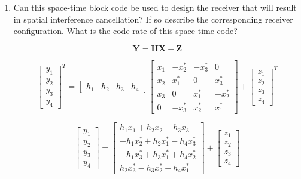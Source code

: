 \documentclass[fleqn]{article}
\begin{document}
\begin{enumerate}
		\begin{enumerate}
			\item Can this space-time block code be used to design the receiver that will result in spatial interference cancellation? If so describe the corresponding receiver configuration. What is the code rate of this space-time code?
			
			\begin{equation*}
				\mathbf{Y} = \mathbf{H}\mathbf{X} + \mathbf{Z}
			\end{equation*}
			
			\begin{equation*}
				\begin{bmatrix}
					y_1 \\ y_2 \\ y_3 \\ y_4
				\end{bmatrix}^T = \begin{bmatrix}
					h_1 & h_2 & h_3 & h_4
				\end{bmatrix}\begin{bmatrix}
					x_1 & -x_2^* & -x_3^* &  0 \\ 
					x_2 &  x_1^* &  0     &  x_3^* \\
					x_3 &  0     &  x_1^* & -x_2^* \\
					0   & -x_3^* &  x_2^* &  x_1^*
				\end{bmatrix} + \begin{bmatrix}
					z_1 \\ z_2 \\ z_3 \\ z_4
				\end{bmatrix}^T
			\end{equation*}
			
			\begin{equation*}
				\begin{bmatrix}
					y_1 \\ y_2 \\ y_3 \\ y_4
				\end{bmatrix} = \begin{bmatrix}
					 h_1x_1   + h_2x_2   + h_3x_3 \\
					-h_1x_2^* + h_2x_1^* - h_4x_3^* \\
					-h_1x_3^* + h_3x_1^* + h_4x_2^* \\
					 h_2x_3^* - h_3x_2^* + h_4x_1^*
				\end{bmatrix} + \begin{bmatrix}
					z_1 \\ z_2 \\ z_3 \\ z_4
				\end{bmatrix}
			\end{equation*}
			

\end{enumerate}
\end{enumerate}
\end{document}
